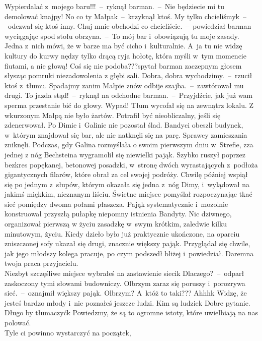 \documentclass[../MAIN.tex]{subfiles}
\begin{document}
\sd \xx
Wypierdalać z~mojego baru!!!~--~ryknął barman.~--~Nie będziecie mi tu
demolować knajpy!
\xx  No co ty Małpa\3k~--~krzyknął ktoś.
\xx  My tylko chcieliśmy\3k~--~odezwał się ktoś inny.
\xx  Chuj mnie obchodzi co chcieliście.~--~powiedział barman wyciągając spod stołu
obrzyna.~--~To mój bar i~obowiązują tu moje zasady. Jedna z~nich mówi, że w
barze ma być cicho i~kulturalnie. A~ja tu nie widzę kultury do kurwy nędzy tylko
drącą ryja hołotę, która myśli w~tym momencie fiutami, a nie głową!
Coś się nie podoba???\x spytał barman zaczepnym głosem słysząc pomruki niezadowolenia z
głębi sali.%
\xx  Dobra, dobra wychodzimy.~--~rzucił ktoś z~tłumu.
\xx  Spadajmy zanim Małpie
znów odbije szajba.~--~zawtórował mu drugi.
\xx  To jazda stąd!~--~ryknął na odchodne barman.~--~Przyjdźcie, jak już wam
sperma przestanie bić do głowy. Wypad!
\qm
Tłum wycofał się na zewnątrz lokalu. Z wkurzonym Małpą nie było żartów. Potrafił
być nieobliczalny, jeśli się zdenerwował. Po Dimie i~Galinie nie pozostał ślad.
Bandyci obeszli budynek, w~którym znajdował się bar, ale nie natknęli się na
parę. Sprawcy zamieszania zniknęli.
\mm Podczas, gdy Galina rozmyślała o swoim pierwszym dniu w~Strefie, zza jednej z
nóg Bechsteina wygramolił się niewielki pająk. Szybko ruszył poprzez bezkres
popękanej, betonowej posadzki, w~stronę dwóch wyrastających z~podłoża
gigantycznych filarów, które obrał za cel swojej podróży. Chwilę później wspiął
się po jednym z~słupów, którym okazała się jedna z~nóg Dimy, i~wylądował na
jakimś miękkim, nieznanym liściu. Świetne miejsce pomyślał rozpoczynając tkać
sieć pomiędzy dwoma połami płaszcza. Pająk systematycznie i~mozolnie konstruował
przyszłą pułapkę niepomny istnienia Bandyty. Nic dziwnego, organizował pierwszą
w życiu zasadzkę w~swym krótkim, zaledwie kilku minutowym, życiu. Kiedy dzieło
było już praktycznie ukończone, na oparciu zniszczonej sofy ukazał się drugi,
znacznie większy pająk. Przyglądał się chwile, jak jego młodszy kolega pracuje,
po czym podszedł bliżej i~powiedział.
\sx
Daremna twoja praca przyjacielu.\\ Niezbyt szczęśliwe miejsce wybrałeś na
zastawienie sieci\3k
\xx  Dlaczego?~--~odparł zaskoczony tymi słowami budowniczy.
\xx  Olbrzym zaraz się poruszy i~porozrywa sieć.~--~oznajmił większy pająk.
\xx  Olbrzym? A~któż to taki???
\xx  Ahhh\3k Widzę, że jesteś bardzo młody i~nie poznałeś jeszcze ludzi. Kim są
ludzie\3k Dobre pytanie. Długo by tłumaczyć\3k Powiedzmy, że są to ogromne
istoty, które uwielbiają na nas polować.\\ Tyle ci powinno wystarczyć na początek,
\end{document}
